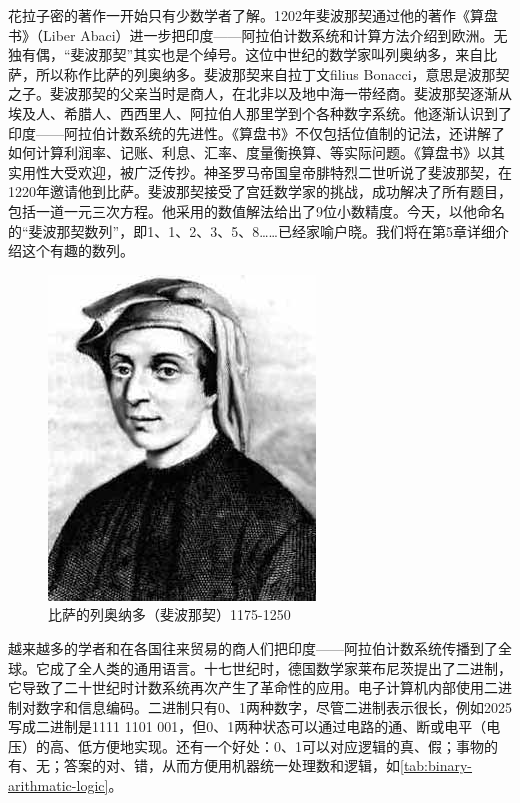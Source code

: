 \documentclass[b5paper]{ctexart}
\begin{document}
花拉子密的著作一开始只有少数学者了解。1202年斐波那契通过他的著作《算盘书》（Liber Abaci）进一步把印度——阿拉伯计数系统和计算方法介绍到欧洲。无独有偶，“斐波那契”其实也是个绰号。这位中世纪的数学家叫列奥纳多，来自比萨，所以称作比萨的列奥纳多。斐波那契来自拉丁文filius Bonacci，意思是波那契之子。斐波那契的父亲当时是商人，在北非以及地中海一带经商。斐波那契逐渐从埃及人、希腊人、西西里人、阿拉伯人那里学到个各种数字系统。他逐渐认识到了印度——阿拉伯计数系统的先进性。《算盘书》不仅包括位值制的记法，还讲解了如何计算利润率、记账、利息、汇率、度量衡换算、等实际问题。《算盘书》以其实用性大受欢迎，被广泛传抄。神圣罗马帝国皇帝腓特烈二世听说了斐波那契，在1220年邀请他到比萨。斐波那契接受了宫廷数学家的挑战，成功解决了所有题目，包括一道一元三次方程。他采用的数值解法给出了9位小数精度。今天，以他命名的“斐波那契数列”，即1、1、2、3、5、8……已经家喻户晓。我们将在第5章详细介绍这个有趣的数列。

\begin{figure}[htbp]
 \centering
 \includegraphics[scale=0.35]{img/Fibonacci}
 \caption{比萨的列奥纳多（斐波那契）1175-1250}
 \label{fig:Fibonacci}
\end{figure}

越来越多的学者和在各国往来贸易的商人们把印度——阿拉伯计数系统传播到了全球。它成了全人类的通用语言。十七世纪时，德国数学家莱布尼茨提出了二进制，它导致了二十世纪时计数系统再次产生了革命性的应用。电子计算机内部使用二进制对数字和信息编码。二进制只有0、1两种数字，尽管二进制表示很长，例如2025写成二进制是1111 1101 001，但0、1两种状态可以通过电路的通、断或电平（电压）的高、低方便地实现。还有一个好处：0、1可以对应逻辑的真、假；事物的有、无；答案的对、错，从而方便用机器统一处理数和逻辑，如\cref{tab:binary-arithmatic-logic}。
\end{document}
